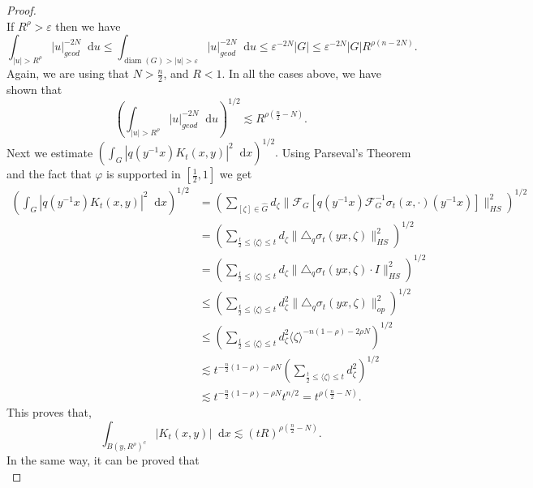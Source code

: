 \documentclass[12pt, reqno]{amsart}
\theoremstyle{definition}
\theoremstyle{remark}
\numberwithin{equation}{section}
\newcommand*\diff{\mathop{}\!\mathrm{d}}
\begin{document}
\begin{proof}
\begin{equation*}
   \end{equation*}
   If $R^\rho>\varepsilon$ then we have
   \begin{equation*}
       \int_{|u|>R^\rho}|u|^{-2N}_{geod}\diff{u}\leq\int_{\operatorname{diam}(G)>|u|>\varepsilon}|u|^{-2N}_{geod}\diff{u}\leq\varepsilon^{-2N}|G|\leq\varepsilon^{-2N}|G|R^{\rho(n-2N)}.
   \end{equation*}
   Again, we are using that $N>\frac{n}{2}$, and $R<1$. In all the cases above, we have shown that
   \begin{equation*}
       \left(\int_{|u|>R^\rho}|u|_{geod}^{-2N}\diff{u}\right)^{1/2}\lesssim R^{\rho(\frac{n}{2}-N)}.
   \end{equation*}
Next we estimate $\left(\int_{G}|q(y^{-1}x)K_t(x,y)|^2\diff{x}\right)^{1/2}.$ Using Parseval's Theorem and the fact that $\varphi$ is supported in $[\frac{1}{2},1]$ we get
\begin{equation*}
     \begin{aligned}
       \left(\int_{G}|q(y^{-1}x)K_t(x,y)|^2\diff{x}\right)^{1/2}
       &=\left(\sum_{[\zeta]\in\widehat{G}}d_\zeta\|\mathcal{F}_G[{q(y^{-1}x)\mathcal{F}_{G}^{-1}\sigma_t(x,\cdot)(y^{-1}x)}]\|_{HS}^2\right)^{1/2}\\
       &=\left(\sum_{\frac{t}{2}\leq\langle\zeta\rangle\leq t}d_\zeta\|\triangle_q\sigma_t(yx,\zeta)\|_{HS}^2\right)^{1/2}\\
       &=\left(\sum_{\frac{t}{2}\leq\langle\zeta\rangle\leq t}d_\zeta\|\triangle_q\sigma_t(yx,\zeta)\cdot I\|_{HS}^2\right)^{1/2}\\
       &\leq\left(\sum_{\frac{t}{2}\leq\langle\zeta\rangle\leq t}d_\zeta^2\|\triangle_q\sigma_t(yx,\zeta)\|_{op}^2\right)^{1/2}\\
       &\leq\left(\sum_{\frac{t}{2}\leq\langle\zeta\rangle\leq t}d_\zeta^2\langle\zeta\rangle^{-n(1-\rho)-2\rho N}\right)^{1/2}\\
       &\lesssim t^{-\frac{n}{2}(1-\rho)-\rho N}\left(\sum_{\frac{t}{2}\leq\langle\zeta\rangle\leq t}d_\zeta^2\right)^{1/2}\\
       &\lesssim t^{-\frac{n}{2}(1-\rho)-\rho N} t^{n/2}=t^{\rho(\frac{n}{2}-N)}.
   \end{aligned}
   \end{equation*}
   This proves that,
   \begin{equation*}
       \int_{B(y,R^\rho)^c}|K_t(x,y)|\diff{x}\lesssim (tR)^{\rho(\frac{n}{2}-N)}.
   \end{equation*}
   In the same way, it can be proved that 
   \begin{equation*}

\end{equation*}
\end{proof}
\end{document}
